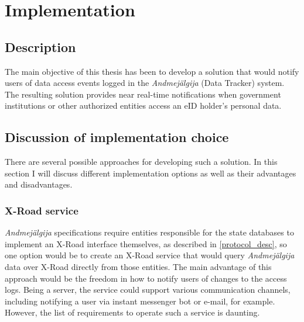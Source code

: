 \section{Implementation}

\subsection{Description}

The main objective of this thesis has been to develop a solution that would notify users of data access events logged in the \textit{Andmejälgija} (Data Tracker) system. The resulting solution provides near real-time notifications when government institutions or other authorized entities access an eID holder's personal data.

\subsection{Discussion of implementation choice}
There are several possible approaches for developing such a solution. In this section I will discuss different implementation options as well as their advantages and disadvantages.

\subsubsection{X-Road service}
\textit{Andmejälgija} specifications require entities responsible for the state databases to implement an X-Road interface themselves, as described in \ref{protocol_desc}, so one option would be to create an X-Road service that would query \textit{Andmejälgija} data over X-Road directly from those entities. The main advantage of this approach would be the freedom in how to notify users of changes to the access logs. Being a server, the service could support various communication channels, including notifying a user via instant messenger bot or e-mail, for example. However, the list of requirements to operate such a service is daunting. 

